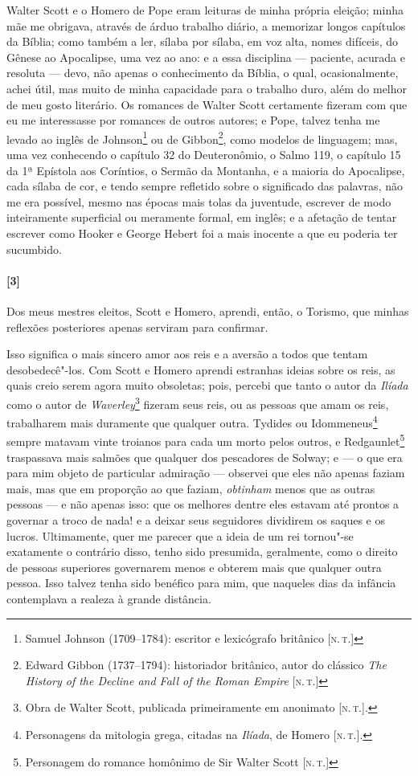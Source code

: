 Walter Scott e o Homero de Pope eram leituras de minha própria eleição;
minha mãe me obrigava, através de árduo trabalho diário, a memorizar
longos capítulos da Bíblia; como também a ler, sílaba por sílaba, em voz
alta, nomes difíceis, do Gênese ao Apocalipse, uma vez ao ano: e a essa
disciplina --- paciente, acurada e resoluta --- devo, não apenas o
conhecimento da Bíblia, o qual, ocasionalmente, achei útil, mas muito de
minha capacidade para o trabalho duro, além do melhor de meu gosto
literário. Os romances de Walter Scott certamente fizeram com que eu me
interessasse por romances de outros autores; e Pope, talvez tenha me
levado ao inglês de Johnson\footnote{Samuel Johnson (1709--1784):
  escritor e lexicógrafo britânico {[}\textsc{n.\,t.}{]}} ou de
Gibbon\footnote{Edward Gibbon (1737--1794): historiador britânico, autor
  do clássico \emph{The History of the Decline and Fall of the Roman
  Empire} {[}\textsc{n.\,t.}{]}}, como modelos de linguagem; mas, uma vez
conhecendo o capítulo 32 do Deuteronômio, o Salmo 119, o capítulo 15 da
1ª Epístola aos Coríntios, o Sermão da Montanha, e a maioria do
Apocalipse, cada sílaba de cor, e tendo sempre refletido sobre o
significado das palavras, não me era possível, mesmo nas épocas mais
tolas da juventude, escrever de modo inteiramente superficial ou
meramente formal, em inglês; e a afetação de tentar escrever como Hooker
e George Hebert foi a mais inocente a que eu poderia ter sucumbido.

\paragraph{[3]} Dos meus mestres eleitos, Scott e Homero, aprendi, então, o Torismo,
que minhas reflexões posteriores apenas serviram para confirmar.

Isso significa o mais sincero amor aos reis e a aversão a todos que
tentam desobedecê"-los. Com Scott e Homero aprendi estranhas ideias sobre
os reis, as quais creio serem agora muito obsoletas; pois, percebi que
tanto o autor da \emph{Ilíada} como o autor de \emph{Waverley}\footnote{Obra
  de Walter Scott, publicada primeiramente em anonimato {[}\textsc{n.\,t.}{]}.}
fizeram seus reis, ou as pessoas que amam os reis, trabalharem mais
duramente que qualquer outra. Tydides ou Idommeneus\footnote{Personagens
  da mitologia grega, citadas na \emph{Ilíada}, de Homero {[}\textsc{n.\,t.}{]}.} sempre matavam vinte troianos para cada um morto pelos outros,
e Redgaunlet\footnote{Personagem do romance homônimo de Sir Walter Scott
  {[}\textsc{n.\,t.}{]}} traspassava mais salmões que qualquer dos pescadores
de Solway; e --- o que era para mim objeto de particular admiração ---
observei que eles não apenas faziam mais, mas que em proporção ao que
faziam, \emph{obtinham} menos que as outras pessoas --- e não apenas
isso: que os melhores dentre eles estavam até prontos a governar a troco
de nada! e a deixar seus seguidores dividirem os saques e os lucros.
Ultimamente, quer me parecer que a ideia de um rei tornou"-se exatamente
o contrário disso, tenho sido presumida, geralmente, como o direito de
pessoas superiores governarem menos e obterem mais que qualquer outra
pessoa. Isso talvez tenha sido benéfico para mim, que naqueles dias da
infância contemplava a realeza à grande distância.

